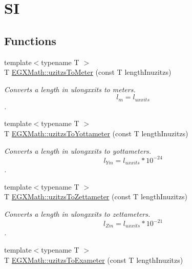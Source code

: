 \hypertarget{group___e_g_x_math-_conversions-_length_conversions-uzitzs-_s_i}{}\section{SI}
\label{group___e_g_x_math-_conversions-_length_conversions-uzitzs-_s_i}
\subsection*{Functions}
\begin{DoxyCompactItemize}
\item 
{\footnotesize template$<$typename T $>$ }\\T \mbox{\hyperlink{group___e_g_x_math-_conversions-_length_conversions-uzitzs-_s_i_gad256d80aa1424b503ded3fda023ee4dd}{E\+G\+X\+Math\+::uzitzs\+To\+Meter}} (const T length\+Inuzitzs)
\begin{DoxyCompactList}\small\item\em Converts a length in ulongxxits to meters. \[ l_{m}=l_{uxxits} \]. \end{DoxyCompactList}\item 
{\footnotesize template$<$typename T $>$ }\\T \mbox{\hyperlink{group___e_g_x_math-_conversions-_length_conversions-uzitzs-_s_i_gac20be4db1eed0397d7925d5b7148dd94}{E\+G\+X\+Math\+::uzitzs\+To\+Yottameter}} (const T length\+Inuzitzs)
\begin{DoxyCompactList}\small\item\em Converts a length in ulongxxits to yottameters. \[ l_{Ym}=l_{uxxits} * 10^{-24} \]. \end{DoxyCompactList}\item 
{\footnotesize template$<$typename T $>$ }\\T \mbox{\hyperlink{group___e_g_x_math-_conversions-_length_conversions-uzitzs-_s_i_ga43f793911855da08c6649eb9b059d9c2}{E\+G\+X\+Math\+::uzitzs\+To\+Zettameter}} (const T length\+Inuzitzs)
\begin{DoxyCompactList}\small\item\em Converts a length in ulongxxits to zettameters. \[ l_{Zm}=l_{uxxits} * 10^{-21} \]. \end{DoxyCompactList}\item 
{\footnotesize template$<$typename T $>$ }\\T \mbox{\hyperlink{group___e_g_x_math-_conversions-_length_conversions-uzitzs-_s_i_ga4c102f14f5804c46db22137411ceb3be}{E\+G\+X\+Math\+::uzitzs\+To\+Exameter}} (const T length\+Inuzitzs)

\end{DoxyCompactItemize}
